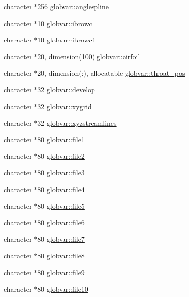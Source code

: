 \begin{DoxyCompactItemize}
character $\ast$256 \hyperlink{namespaceglobvar_a35d25dc36b9abbf2f578dcdb231ba86d}{globvar\+::anglespline}
\item 
character $\ast$10 \hyperlink{namespaceglobvar_a893ea8284df7ea110ea93d673cf237f9}{globvar\+::ibrowc}
\item 
character $\ast$10 \hyperlink{namespaceglobvar_a0a7f8083468e94d2d3aae1f309fb2dd4}{globvar\+::ibrowc1}
\item 
character $\ast$20, dimension(100) \hyperlink{namespaceglobvar_ae69735f940091c76c32c20b4cd90ebb4}{globvar\+::airfoil}
\item 
character $\ast$20, dimension(\+:), allocatable \hyperlink{namespaceglobvar_a8e9e3ba0b38e35c9b6b0c02e62ffc1f8}{globvar\+::throat\+\_\+pos}
\item 
character $\ast$32 \hyperlink{namespaceglobvar_acc5999ee5e843ad4d03a5047a316e813}{globvar\+::develop}
\item 
character $\ast$32 \hyperlink{namespaceglobvar_a32441db96414a17de3451c8789d1edb3}{globvar\+::xygrid}
\item 
character $\ast$32 \hyperlink{namespaceglobvar_a683af9844336d830d4c99a6f542260ad}{globvar\+::xyzstreamlines}
\item 
character $\ast$80 \hyperlink{namespaceglobvar_a914ee6e2252c7098aff0eb09f1646f79}{globvar\+::file1}
\item 
character $\ast$80 \hyperlink{namespaceglobvar_a95f5c32d6cc281292091a3f0c77928e2}{globvar\+::file2}
\item 
character $\ast$80 \hyperlink{namespaceglobvar_a50a9cac1bfd7e2b8ba993f2e494e61af}{globvar\+::file3}
\item 
character $\ast$80 \hyperlink{namespaceglobvar_ad37b1da3092de9a9a76be4f2f8c97231}{globvar\+::file4}
\item 
character $\ast$80 \hyperlink{namespaceglobvar_a2cf5ea09c434891e0a0154c05a3a55dc}{globvar\+::file5}
\item 
character $\ast$80 \hyperlink{namespaceglobvar_a1f007a363d48ae7b896f7303fb7b94c9}{globvar\+::file6}
\item 
character $\ast$80 \hyperlink{namespaceglobvar_aedb6df66bd85d51a0e7a4abaf0833074}{globvar\+::file7}
\item 
character $\ast$80 \hyperlink{namespaceglobvar_afe69a24b80357a46880b963d07e777f4}{globvar\+::file8}
\item 
character $\ast$80 \hyperlink{namespaceglobvar_ae35b72b87d0bb3063a6a44013250ce2a}{globvar\+::file9}
\item 
character $\ast$80 \hyperlink{namespaceglobvar_a6581bd3170639009e3b516cfef2969cf}{globvar\+::file10}

\end{DoxyCompactItemize}
